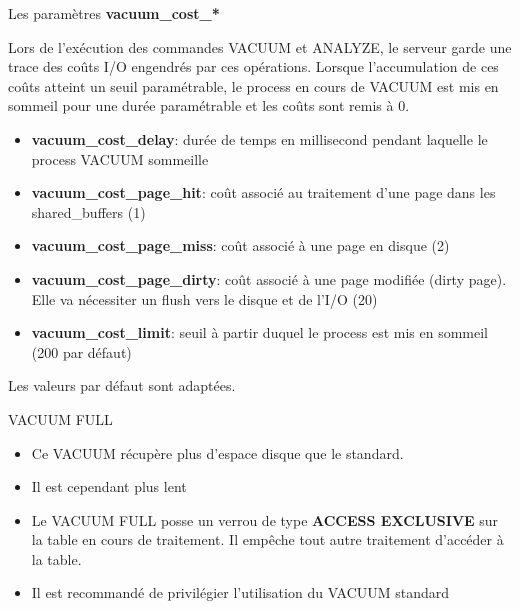 
\begin{frame}{Les paramètres \textbf{vacuum\_cost\_*}}

   Lors de l'exécution des commandes VACUUM et ANALYZE, le serveur garde une trace des coûts I/O engendrés par ces opérations. Lorsque l'accumulation de ces coûts atteint un seuil paramétrable, le process en cours de VACUUM est mis en sommeil pour une durée paramétrable et les coûts sont remis à 0.
   \begin{itemize}
      \item \textbf{vacuum\_cost\_delay}: durée de temps en millisecond pendant laquelle le process VACUUM sommeille
      \item \textbf{vacuum\_cost\_page\_hit}: coût associé au traitement d'une page dans les shared\_buffers (1)
      \item \textbf{vacuum\_cost\_page\_miss}: coût associé à une page en disque (2)
      \item \textbf{vacuum\_cost\_page\_dirty}: coût associé à une page modifiée (dirty page). Elle va nécessiter un flush vers le disque et de l'I/O (20)
      \item \textbf{vacuum\_cost\_limit}: seuil à partir duquel le process est mis en sommeil (200 par défaut)
   \end{itemize}

   Les valeurs par défaut sont adaptées.

\begin{toile}
\end{toile}
   
\end{frame}


\begin{frame}{VACUUM FULL}

   \begin{itemize}
      \item Ce VACUUM récupère plus d'espace disque que le standard.
      \item Il est cependant plus lent
      \item Le VACUUM FULL posse un verrou de type \textbf{ACCESS EXCLUSIVE} sur la table en cours de traitement. Il empêche tout autre traitement d'accéder à la table.
      \item Il est recommandé de privilégier l'utilisation du VACUUM standard
   \end{itemize}

\end{frame}

